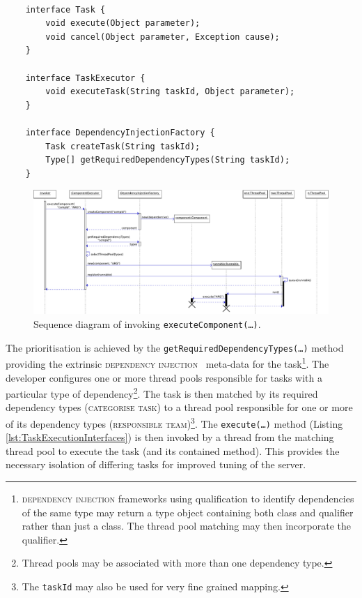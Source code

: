 \documentclass[prodmode]{style/acmlarge}
\begin{document}
\begin{lstlisting}[float,label=lst:TaskExecutionInterfaces]

    interface Task {
        void execute(Object parameter); 
        void cancel(Object parameter, Exception cause);
    }

    interface TaskExecutor {
        void executeTask(String taskId, Object parameter);
    }

    interface DependencyInjectionFactory {
        Task createTask(String taskId);
        Type[] getRequiredDependencyTypes(String taskId);
    }
\end{lstlisting}


\begin{figure}[!t]
\centering
\includegraphics[width=6in]{ExecuteComponentSequenceDiagram}
\caption{Sequence diagram of invoking \texttt{executeComponent(\ldots)}.}
\label{fig:ExecuteComponentSequenceDiagram}
\end{figure}

The prioritisation is achieved by the
\texttt{getRequiredDependencyTypes(\ldots)} method providing the extrinsic
\textsc{dependency injection}~\cite{ioc} meta-data for the
task\footnote{\textsc{dependency injection} frameworks using qualification to
identify dependencies of the same type may return a type object containing both
class and qualifier rather than just a class.  The thread pool matching may then
incorporate the qualifier.}.  The developer configures one or more thread pools
responsible for tasks with a particular type of dependency\footnote{Thread pools
may be associated with more than one dependency type.}.  The task is then
matched by its required dependency types (\textsc{categorise task}) to a thread
pool responsible for one or more of its dependency types (\textsc{responsible
team})\footnote{The \texttt{taskId} may also be used for very fine grained
mapping.}.  The \texttt{execute(\ldots)} method (Listing
\ref{lst:TaskExecutionInterfaces}) is then invoked by a thread from the matching
thread pool to execute the task (and its contained method). This provides the
necessary isolation of differing tasks for improved tuning of the server.
\end{document}
